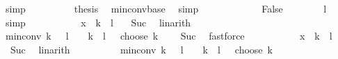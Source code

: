 \begin{isabellebody}
\ simp\isanewline
\ \ \ \ \ \ \isamarkupfalse%
\ \isamarkupfalse%
\ {\isacharquery}{\kern0pt}thesis\ \isamarkupfalse%
\ min{\isacharunderscore}{\kern0pt}conv{\isacharunderscore}{\kern0pt}base\ \isamarkupfalse%
\ simp\isanewline
\ \ \ \ \isamarkupfalse%
\isanewline
\ \ \ \ \ \ \isamarkupfalse%
\ False\isanewline
\ \ \ \ \ \ \isamarkupfalse%
\ {}{\isacharcolon}{\kern0pt}{\isachardoublequoteopen}l{\isasymge}{}{\isachardoublequoteclose}\ \isamarkupfalse%
\ simp\isanewline
\ \ \ \ \ \ \isamarkupfalse%
\ \ \ \ {\isachardoublequoteopen}x\ {\isacharequal}{\kern0pt}\ {\isacharparenleft}{\kern0pt}k{\isacharminus}{\kern0pt}{}{\isacharparenright}{\kern0pt}\ {\isacharplus}{\kern0pt}\ l{\isachardoublequoteclose}\ \isamarkupfalse%
\ {}\ Suc\ \isamarkupfalse%
\ linarith\isanewline
\ \ \ \ \ \ \isamarkupfalse%
\ {}{\isacharcolon}{\kern0pt}{\isachardoublequoteopen}min{\isacharunderscore}{\kern0pt}conv\ {\isacharparenleft}{\kern0pt}k\ {\isacharplus}{\kern0pt}\ {}{\isacharparenright}{\kern0pt}\ {\isacharparenleft}{\kern0pt}l\ {\isacharplus}{\kern0pt}\ {}{\isacharparenright}{\kern0pt}\ {\isacharequal}{\kern0pt}\ {\isacharparenleft}{\kern0pt}k\ {\isacharplus}{\kern0pt}\ l\ {\isacharplus}{\kern0pt}\ {}\ choose\ k{\isacharparenright}{\kern0pt}\ {\isacharplus}{\kern0pt}\ {}{\isachardoublequoteclose}\ \isamarkupfalse%
\ Suc\ \isamarkupfalse%
\ fastforce\isanewline
\ \ \ \ \ \ \isamarkupfalse%
\ \ \ \ {\isachardoublequoteopen}x\ {\isacharequal}{\kern0pt}\ k\ {\isacharplus}{\kern0pt}\ {\isacharparenleft}{\kern0pt}l{\isacharminus}{\kern0pt}{}{\isacharparenright}{\kern0pt}{\isachardoublequoteclose}\ \isamarkupfalse%
\ {}\ Suc\ \isamarkupfalse%
\ linarith\isanewline
\ \ \ \ \ \ \isamarkupfalse%
\ \ \ {\isachardoublequoteopen}min{\isacharunderscore}{\kern0pt}conv\ {\isacharparenleft}{\kern0pt}k\ {\isacharplus}{\kern0pt}\ {}{\isacharparenright}{\kern0pt}\ {\isacharparenleft}{\kern0pt}l\ {\isacharplus}{\kern0pt}\ {}{\isacharparenright}{\kern0pt}\ {\isacharequal}{\kern0pt}\ {\isacharparenleft}{\kern0pt}k\ {\isacharplus}{\kern0pt}\ l\ {\isacharplus}{\kern0pt}\ {}\ choose\ k\ {\isacharplus}{\kern0pt}\ {}{\isacharparenright}{\kern0pt}\ {\isacharplus}{\kern0pt}\ {}{\isachardoublequoteclose}\ \isamarkupfalse%

\end{isabellebody}
